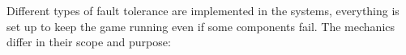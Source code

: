 \documentclass{scrartcl}
\begin{document}


Different types of fault tolerance are implemented in the systems, everything is set up to keep
the game running even if some components fail. \newline
The mechanics differ in their scope and purpose:
\end{document}
